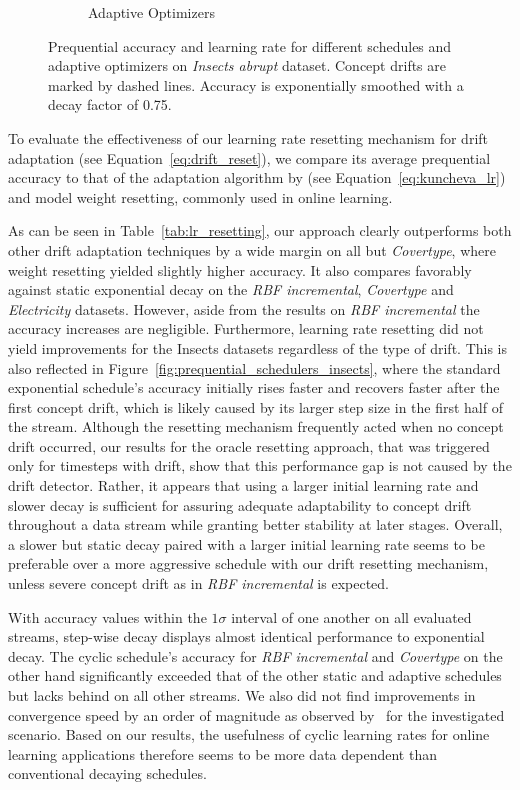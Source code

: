 \documentclass[runningheads]{llncs}
\begin{document}
\begin{figure}[ht]
\begin{subfigure}[b]{0.47\textwidth}
		\caption{Adaptive Optimizers}
		\label{fig:prequential_optims_insects}
	\end{subfigure}
	\caption{Prequential accuracy and learning rate for different schedules and adaptive optimizers on \textit{Insects abrupt} dataset. Concept drifts are marked by dashed lines. Accuracy is exponentially smoothed with a decay factor of 0.75.}
\end{figure}

To evaluate the effectiveness of our learning rate resetting mechanism for drift adaptation (see Equation~\eqref{eq:drift_reset}), we compare its average prequential accuracy to that of the adaptation algorithm by \textcite{kunchevaAdaptiveLearningRate2008} (see Equation~\eqref{eq:kuncheva_lr}) and model weight resetting, commonly used in online learning.

As can be seen in Table~\ref{tab:lr_resetting}, our approach clearly outperforms both other drift adaptation techniques by a wide margin on all but \textit{Covertype}, where weight resetting yielded slightly higher accuracy.
It also compares favorably against static exponential decay on the \textit{RBF incremental}, \textit{Covertype} and \textit{Electricity} datasets.
However, aside from the results on \textit{RBF incremental} the accuracy increases are negligible.
Furthermore, learning rate resetting did not yield improvements for the Insects datasets regardless of the type of drift.
This is also reflected in Figure~\ref{fig:prequential_schedulers_insects}, where the standard exponential schedule's accuracy initially rises faster and recovers faster after the first concept drift, which is likely caused by its larger step size in the first half of the stream.
Although the resetting mechanism frequently acted when no concept drift occurred, our results for the oracle resetting approach, that was triggered only for timesteps with drift, show that this performance gap is not caused by the drift detector.
Rather, it appears that using a larger initial learning rate and slower decay is sufficient for assuring adequate adaptability to concept drift throughout a data stream while granting better stability at later stages.
Overall, a slower but static decay paired with a larger initial learning rate seems to be preferable over a more aggressive schedule with our drift resetting mechanism, unless severe concept drift as in \textit{RBF incremental} is expected.

With accuracy values within the $1\sigma$ interval of one another on all evaluated streams, step-wise decay displays almost identical performance to exponential decay.
The cyclic schedule's accuracy for \textit{RBF incremental} and \textit{Covertype} on the other hand significantly exceeded that of the other static and adaptive schedules but lacks behind on all other streams.
We also did not find improvements in convergence speed by an order of magnitude as observed by~\cite{smithSuperConvergenceVeryFast2018a} for the investigated scenario.
Based on our results, the usefulness of cyclic learning rates for online learning applications therefore seems to be more data dependent than conventional decaying schedules.
\end{document}
